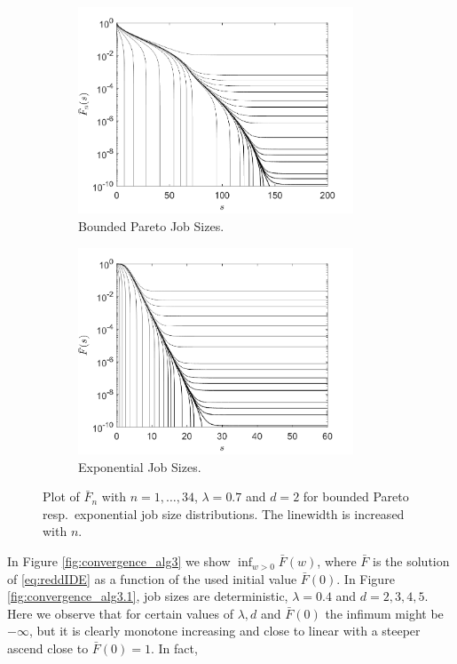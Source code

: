 \documentclass[12pt]{report}
\begin{document}
\begin{figure}[t]
\begin{subfigure}{.45\textwidth}
\centering
\includegraphics[width=0.9\textwidth]{figures/Chapter3/plot_convergence3.pdf}
\caption{Bounded Pareto Job Sizes.}
\label{fig:convergence_alg2.1}
\end{subfigure}
\begin{subfigure}{.45\textwidth}
\centering
\includegraphics[width=0.9\textwidth]{figures/Chapter3/plot_convergence4.pdf}
\caption{Exponential Job Sizes.}
\label{fig:convergence_alg2.2}
\end{subfigure}
\caption{Plot of $\bar F_n$ with $n=1,\dots,34$, $\lambda = 0.7$ and $d=2$ for bounded Pareto resp.~exponential job size distributions. The linewidth is increased with $n$.}
\label{fig:convergence_alg2}
\end{figure}
In Figure \ref{fig:convergence_alg3} we show $\inf_{w>0} \bar F(w)$, where $\bar F$ is the solution of \eqref{eq:reddIDE} as a function of the used initial value $\bar F(0)$. In Figure \ref{fig:convergence_alg3.1}, job sizes are deterministic, $\lambda = 0.4$ and $d=2,3,4,5$. Here we observe that for certain values of $\lambda, d$ and $\bar F(0)$ the infimum might be $-\infty$, but it is clearly monotone increasing and close to linear with a steeper ascend close to $\bar F(0)=1$. In fact,
\end{document}
